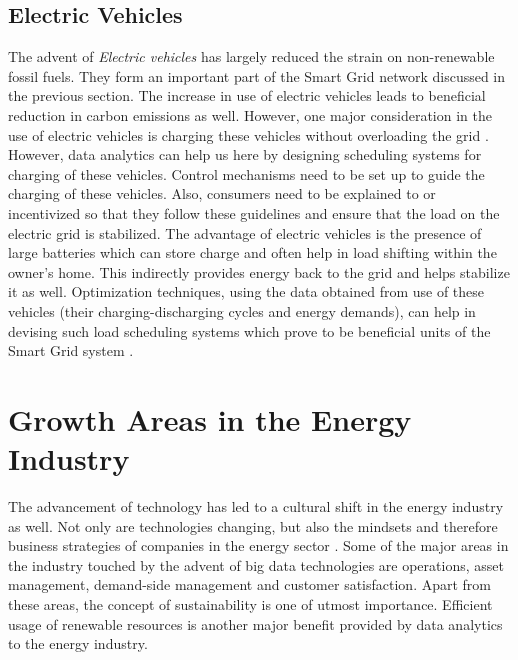 \subsection{Electric Vehicles}
The advent of {\em Electric vehicles} has largely reduced the strain on non-renewable fossil fuels. They form an important part of the Smart Grid network discussed in the previous section. The increase in use of electric vehicles leads to beneficial reduction in carbon emissions as well. However, one major consideration in the use of electric vehicles is charging these vehicles without overloading the grid \cite{acm10}. However, data analytics can help us here by designing scheduling systems for charging of these vehicles. Control mechanisms need to be set up to guide the charging of these vehicles. Also, consumers need to be explained to or incentivized so that they follow these guidelines and ensure that the load on the electric grid is stabilized. The advantage of electric vehicles is the presence of large batteries which can store charge and often help in load shifting within the owner's home. This indirectly provides energy back to the grid and helps stabilize it as well. Optimization techniques, using the data obtained from use of these vehicles (their charging-discharging cycles and energy demands), can help in devising such load scheduling systems which prove to be beneficial units of the Smart Grid system \cite{acm10}. 


\section{Growth Areas in the Energy Industry}
The advancement of technology has led to a cultural shift in the energy industry as well. Not only are technologies changing, but also the mindsets and therefore business strategies of companies in the energy sector \cite{util11}. Some of the major areas in the industry touched by the advent of big data technologies are operations, asset management, demand-side management and customer satisfaction. Apart from these areas, the concept of sustainability is one of utmost importance. Efficient usage of renewable resources is another major benefit provided by data analytics to the energy industry.

